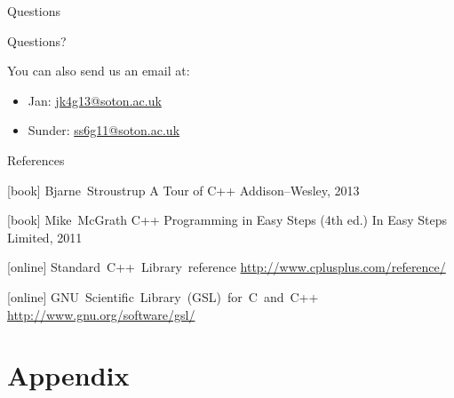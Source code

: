 \documentclass[compress]{beamer}
\begin{document}
%
%

\begin{frame}{Questions}
	
\LARGE{Questions?}

\normalsize You can also send us an email at:
	\begin{itemize}
		\item Jan: \url{jk4g13@soton.ac.uk}
		\item Sunder: \url{ss6g11@soton.ac.uk}
	\end{itemize}
\end{frame}


\begin{frame}{References}
	\begin{thebibliography}{10}
		
		Bjarne~Stroustrup
		\newblock A Tour of C++
		\newblock Addison--Wesley, 2013

		Mike~McGrath
		\newblock C++ Programming in Easy Steps (4th ed.)
		\newblock In Easy Steps Limited, 2011
	
		[online]
		Standard~C++~Library~reference
		\newblock \url{http://www.cplusplus.com/reference/}
		
		[online]
		GNU~Scientific~Library~(GSL)~for~C~and~C++
		\newblock \url{http://www.gnu.org/software/gsl/}
	\end{thebibliography}
\end{frame}

\section{Appendix}
\end{document}
